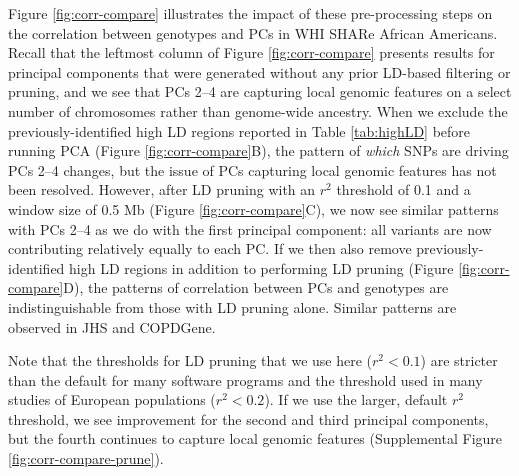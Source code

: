 \documentclass[12pt]{article}
\begin{document}
Figure \ref{fig:corr-compare} illustrates the impact of these pre-processing steps on the correlation between genotypes and PCs in WHI SHARe African Americans. 
Recall that the leftmost column of Figure \ref{fig:corr-compare} presents results for principal components that were generated without any prior LD-based filtering or pruning, and we see that PCs 2--4 are capturing local genomic features on a select number of chromosomes rather than genome-wide ancestry.
When we exclude the previously-identified high LD regions reported in Table \ref{tab:highLD} before running PCA (Figure \ref{fig:corr-compare}B), the pattern of \textit{which} SNPs are driving PCs 2--4 changes, but the issue of PCs capturing local genomic features has not been resolved. 
However, after LD pruning with an $r^2$ threshold of 0.1 and a window size of 0.5 Mb (Figure \ref{fig:corr-compare}C), we now see similar patterns with PCs 2--4 as we do with the first principal component: all variants are now contributing relatively equally to each PC. 
If we then also remove previously-identified high LD regions in addition to performing LD pruning (Figure \ref{fig:corr-compare}D), the patterns of correlation between PCs and genotypes are indistinguishable from those with LD pruning alone. 
Similar patterns are observed in JHS and COPDGene.

Note that the thresholds for LD pruning that we use here ($r^2 < 0.1$) are stricter than the default for many software programs and the threshold used in many studies of European populations ($r^2 < 0.2$).
If we use the larger, default $r^2$ threshold, we see improvement for the second and third principal components, but the fourth continues to capture local genomic features (Supplemental Figure \ref{fig:corr-compare-prune}). 
\end{document}
